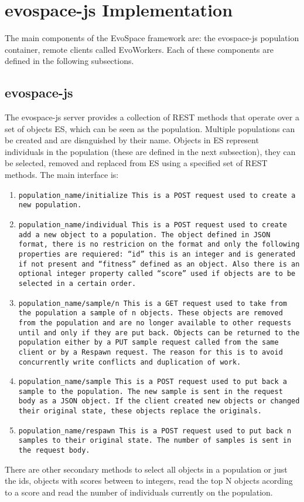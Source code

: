\section{evospace-js Implementation}
\label{sec:evo}
The main components of the EvoSpace framework are: the evospace-js population container, 
remote clients called EvoWorkers. Each of these components are defined in the following subsections.

\subsection{evospace-js}
 \label{sec:evospace}
The evospace-js server provides a collection of REST methods that operate over a set of objects ES, 
which can be seen as the population. Multiple populations can be created and are disnguished by their name.
Objects in ES represent individuals in the population (these are defined in the next subsection), 
they can be selected, removed and replaced from ES using a specified set of REST methods. The main
interface is:
\begin{enumerate}
    \item  \tt {population_name/initialize} This is a POST request used to create a new population.
    \item \tt {population_name/individual} This is a POST request used to create add a new object
    to a population. The object defined in JSON format, there is no restricion on the format and only 
    the following properties are requiered: ``id'' this is an integer and is generated if not present 
    and ``fitness'' defined as an object. Also there is an optional integer property called ``score''
    used if objects are to be selected in a certain order.
    \item \tt {population_name/sample/n}  This is a GET request used to take from the population a 
    sample of \tt{n} objects. These objects are removed from the population and are no longer available
    to other requests until and only if they are put back. Objects can be returned to the population 
    either by a PUT sample request called from the same client or by a Respawn request. The reason for 
    this is to avoid concurrently write conflicts and duplication of work.
    \item \tt {population_name/sample}  This is a POST request used to put back a sample to the population.
    The new sample is sent in the request body as a JSON object. If the client created new objects or 
    changed their original state, these objects replace the originals. 
    \item \tt {population_name/respawn}  This is a POST request used to put back \tt {n} samples to their 
    original state. The number of samples is sent in the request body. 
\end{enumerate}
There are other secondary methods to select all objects in a population or just the ids, objects
with scores between to integers, read the top N objects acording to a score and read the number of
individuals currently on the population.      

